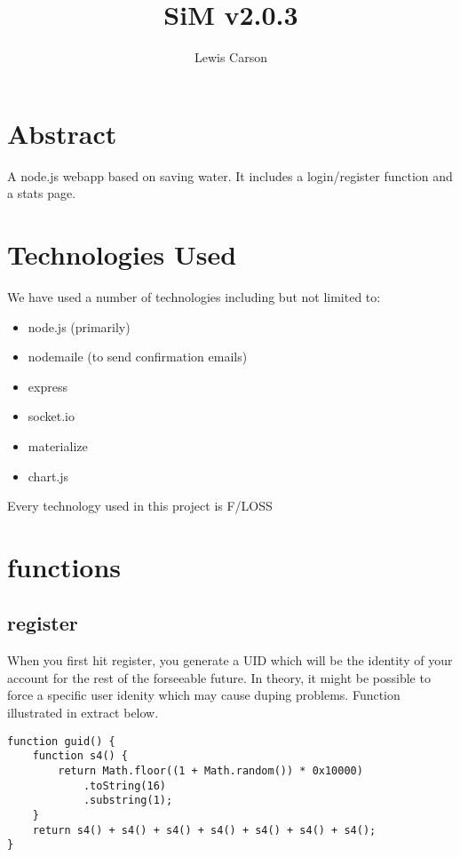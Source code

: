 \documentclass{article}
\begin{document}
\title{SiM v2.0.3}
\author{Lewis Carson}

\maketitle

\section{Abstract}
A node.js webapp based on saving water. It includes a login/register function and a stats page.

\section{Technologies Used}
We have used a number of technologies including but not limited to:

\begin{itemize}
    \item node.js (primarily)
    \item nodemaile (to send confirmation emails)
    \item express
    \item socket.io
    \item materialize
    \item chart.js
\end{itemize}

Every technology used in this project is F/LOSS

\section{functions}
\subsection{register}
When you first hit register, you generate a UID which will be the identity of your account for the rest of the forseeable future. In theory, it might be possible to force a specific user idenity which may cause duping problems. Function illustrated in extract below.

\begin{minipage}{\linewidth}
\begin{lstlisting}
function guid() {
    function s4() {
        return Math.floor((1 + Math.random()) * 0x10000)
            .toString(16)
            .substring(1);
    }
    return s4() + s4() + s4() + s4() + s4() + s4() + s4();
}

\end{lstlisting}
\end{minipage}
\end{document}
